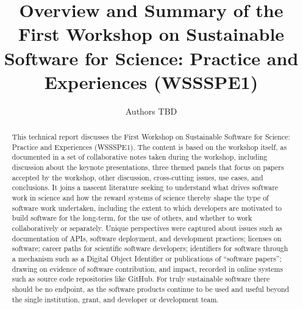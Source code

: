 \documentclass[11pt, oneside]{amsart}
\begin{document}
\title[]{Overview and Summary of the First Workshop on Sustainable Software for Science: Practice and Experiences (WSSSPE1)}

\author{Authors TBD}

%
%
%
%
%

\begin{abstract}
This technical report discusses the First Workshop on Sustainable
Software for Science: Practice and Experiences (WSSSPE1).  The content
is based on the workshop itself, as documented in a set of
collaborative notes taken during the workshop, including discussion
about the keynote presentations, three themed panels that focus on
papers accepted by the workshop, other discussion, cross-cutting
issues, use cases, and conclusions.  It joins a nascent literature
seeking to understand what drives software work in science and how the
reward systems of science thereby shape the type of software work
undertaken, including the extent to which developers are motivated to
build software for the long-term, for the use of others, and whether
to work collaboratively or separately. Unique perspectives were
captured about issues such as documentation of APIs, software
deployment, and development practices; licenses on software; career
paths for scientific software developers; identifiers for software
through a mechanism such as a Digital Object Identifier or
publications of ``software papers''; drawing on evidence of software
contribution, and impact, recorded in online systems such as source
code repositories like GitHub. For truly sustainable software there
should be no endpoint, as the software products continue to be used
and useful beyond the single institution, grant, and developer or
development team.

\end{abstract}


\maketitle
\end{document}
